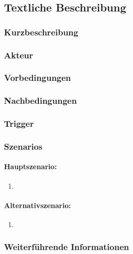 \subsection{Textliche Beschreibung}

\subsubsection{Kurzbeschreibung}

\subsubsection{Akteur}

\subsubsection{Vorbedingungen}

\subsubsection{Nachbedingungen}

\subsubsection{Trigger}


\subsubsection{Szenarios}
\paragraph{Hauptszenario:}

\begin{enumerate}
	\item 
\end{enumerate}



\paragraph{Alternativszenario:}

\begin{enumerate}
	\item 
\end{enumerate}


\subsubsection{Weiterführende Informationen}


